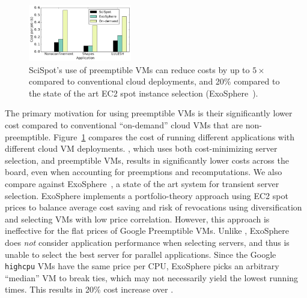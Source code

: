 



\begin{figure}
  \centering
  \includegraphics[width=0.4\textwidth]{../graphs/cost-vs-exosphere.pdf}
  \vspace*{\myfigspace}
  \caption{SciSpot's use of preemptible VMs can reduce costs by up to $5\times$ compared to conventional cloud deployments, and 20\% compared to the state of the art EC2 spot instance selection (ExoSphere~\cite{exosphere}).}
  \label{fig:cost-only-bar}
    \vspace*{\myfigspace}
\end{figure}

The primary motivation for using preemptible VMs is their significantly lower cost compared to conventional ``on-demand'' cloud VMs that are non-preemptible. 
Figure~\ref{fig:cost-only-bar} compares the cost of running different applications with different cloud VM deployments. 
\sysname, which uses both cost-minimizing server selection, and preemptible VMs, results in significantly lower costs across the board, even when accounting for preemptions and recomputations. 
%
We also compare against ExoSphere~\cite{exosphere}, a state of the art  system for transient server selection.
ExoSphere implements a portfolio-theory approach using EC2 spot prices to balance average cost saving and risk of revocations using diversification and selecting VMs with low price correlation.
However, this approach is ineffective for the flat prices of Google Preemptible VMs. 
Unlike \sysname, ExoSphere does \emph{not} consider application performance when selecting servers, and thus is unable to select the best server for parallel applications. 
Since the Google \texttt{highcpu} VMs have the same price per CPU, ExoSphere picks an arbitrary ``median'' VM to break ties, which may not necessarily yield the lowest running times.
This results in 20\% cost increase over \sysname. 

